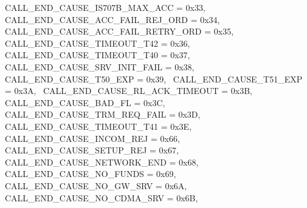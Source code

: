 \begin{DoxyItemize}
 C\+A\+L\+L\+\_\+\+E\+N\+D\+\_\+\+C\+A\+U\+S\+E\+\_\+\+I\+S707\+B\+\_\+\+M\+A\+X\+\_\+\+A\+CC = 0x33,~\newline
 C\+A\+L\+L\+\_\+\+E\+N\+D\+\_\+\+C\+A\+U\+S\+E\+\_\+\+A\+C\+C\+\_\+\+F\+A\+I\+L\+\_\+\+R\+E\+J\+\_\+\+O\+RD = 0x34,~\newline
 C\+A\+L\+L\+\_\+\+E\+N\+D\+\_\+\+C\+A\+U\+S\+E\+\_\+\+A\+C\+C\+\_\+\+F\+A\+I\+L\+\_\+\+R\+E\+T\+R\+Y\+\_\+\+O\+RD = 0x35,~\newline
 C\+A\+L\+L\+\_\+\+E\+N\+D\+\_\+\+C\+A\+U\+S\+E\+\_\+\+T\+I\+M\+E\+O\+U\+T\+\_\+\+T42 = 0x36,~\newline
 C\+A\+L\+L\+\_\+\+E\+N\+D\+\_\+\+C\+A\+U\+S\+E\+\_\+\+T\+I\+M\+E\+O\+U\+T\+\_\+\+T40 = 0x37,~\newline
 C\+A\+L\+L\+\_\+\+E\+N\+D\+\_\+\+C\+A\+U\+S\+E\+\_\+\+S\+R\+V\+\_\+\+I\+N\+I\+T\+\_\+\+F\+A\+IL = 0x38,~\newline
 C\+A\+L\+L\+\_\+\+E\+N\+D\+\_\+\+C\+A\+U\+S\+E\+\_\+\+T50\+\_\+\+E\+XP = 0x39,~\newline
 C\+A\+L\+L\+\_\+\+E\+N\+D\+\_\+\+C\+A\+U\+S\+E\+\_\+\+T51\+\_\+\+E\+XP = 0x3A,~\newline
 C\+A\+L\+L\+\_\+\+E\+N\+D\+\_\+\+C\+A\+U\+S\+E\+\_\+\+R\+L\+\_\+\+A\+C\+K\+\_\+\+T\+I\+M\+E\+O\+UT = 0x3B,~\newline
 C\+A\+L\+L\+\_\+\+E\+N\+D\+\_\+\+C\+A\+U\+S\+E\+\_\+\+B\+A\+D\+\_\+\+FL = 0x3C,~\newline
 C\+A\+L\+L\+\_\+\+E\+N\+D\+\_\+\+C\+A\+U\+S\+E\+\_\+\+T\+R\+M\+\_\+\+R\+E\+Q\+\_\+\+F\+A\+IL = 0x3D,~\newline
 C\+A\+L\+L\+\_\+\+E\+N\+D\+\_\+\+C\+A\+U\+S\+E\+\_\+\+T\+I\+M\+E\+O\+U\+T\+\_\+\+T41 = 0x3E,~\newline
 C\+A\+L\+L\+\_\+\+E\+N\+D\+\_\+\+C\+A\+U\+S\+E\+\_\+\+I\+N\+C\+O\+M\+\_\+\+R\+EJ = 0x66,~\newline
 C\+A\+L\+L\+\_\+\+E\+N\+D\+\_\+\+C\+A\+U\+S\+E\+\_\+\+S\+E\+T\+U\+P\+\_\+\+R\+EJ = 0x67,~\newline
 C\+A\+L\+L\+\_\+\+E\+N\+D\+\_\+\+C\+A\+U\+S\+E\+\_\+\+N\+E\+T\+W\+O\+R\+K\+\_\+\+E\+ND = 0x68,~\newline
 C\+A\+L\+L\+\_\+\+E\+N\+D\+\_\+\+C\+A\+U\+S\+E\+\_\+\+N\+O\+\_\+\+F\+U\+N\+DS = 0x69,~\newline
 C\+A\+L\+L\+\_\+\+E\+N\+D\+\_\+\+C\+A\+U\+S\+E\+\_\+\+N\+O\+\_\+\+G\+W\+\_\+\+S\+RV = 0x6A,~\newline
 C\+A\+L\+L\+\_\+\+E\+N\+D\+\_\+\+C\+A\+U\+S\+E\+\_\+\+N\+O\+\_\+\+C\+D\+M\+A\+\_\+\+S\+RV = 0x6B,~\newline

\end{DoxyItemize}
